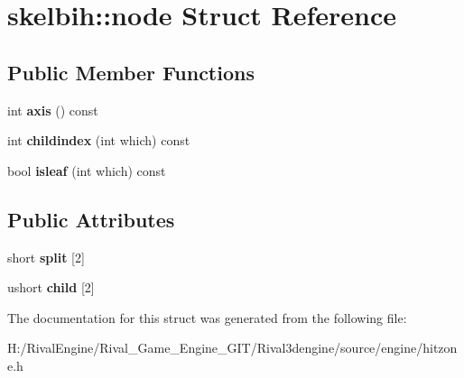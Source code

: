 \hypertarget{structskelbih_1_1node}{}\section{skelbih\+:\+:node Struct Reference}
\label{structskelbih_1_1node}
\subsection*{Public Member Functions}
\begin{DoxyCompactItemize}
\item 
\mbox{\label{structskelbih_1_1node_a4af9b0429d88128e85b11f112751907f}} 
int {\bfseries axis} () const
\item 
\mbox{\label{structskelbih_1_1node_a46ff40f32cc53f1c42cda5fdefd4833b}} 
int {\bfseries childindex} (int which) const
\item 
\mbox{\label{structskelbih_1_1node_afe46469b49578a7944e2048f1b76242f}} 
bool {\bfseries isleaf} (int which) const
\end{DoxyCompactItemize}
\subsection*{Public Attributes}
\begin{DoxyCompactItemize}
\item 
\mbox{\label{structskelbih_1_1node_a80cb37b66b2894dc9a9126b799dd86af}} 
short {\bfseries split} \mbox{[}2\mbox{]}
\item 
\mbox{\label{structskelbih_1_1node_afcf24b2a259e70d82fe75f282066c73c}} 
ushort {\bfseries child} \mbox{[}2\mbox{]}
\end{DoxyCompactItemize}


The documentation for this struct was generated from the following file\+:\begin{DoxyCompactItemize}
\item 
H\+:/\+Rival\+Engine/\+Rival\+\_\+\+Game\+\_\+\+Engine\+\_\+\+G\+I\+T/\+Rival3dengine/source/engine/hitzone.\+h\end{DoxyCompactItemize}
